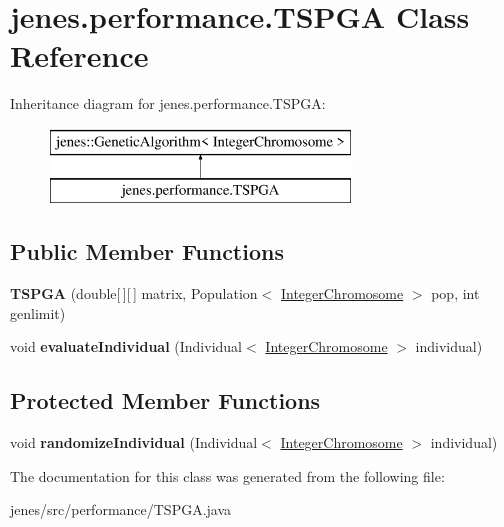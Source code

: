 \hypertarget{classjenes_1_1performance_1_1_t_s_p_g_a}{\section{jenes.\-performance.\-T\-S\-P\-G\-A Class Reference}
\label{classjenes_1_1performance_1_1_t_s_p_g_a}
}
Inheritance diagram for jenes.\-performance.\-T\-S\-P\-G\-A\-:\begin{figure}[H]
\begin{center}
\leavevmode
\includegraphics[height=2.000000cm]{classjenes_1_1performance_1_1_t_s_p_g_a}
\end{center}
\end{figure}
\subsection*{Public Member Functions}
\begin{DoxyCompactItemize}
\item 
\hypertarget{classjenes_1_1performance_1_1_t_s_p_g_a_a698ea31a106a7f42ffc65997bbee05fe}{{\bfseries T\-S\-P\-G\-A} (double\mbox{[}$\,$\mbox{]}\mbox{[}$\,$\mbox{]} matrix, Population$<$ \hyperlink{classjenes_1_1chromosome_1_1_integer_chromosome}{Integer\-Chromosome} $>$ pop, int genlimit)}\label{classjenes_1_1performance_1_1_t_s_p_g_a_a698ea31a106a7f42ffc65997bbee05fe}

\item 
\hypertarget{classjenes_1_1performance_1_1_t_s_p_g_a_a78282f6c98a63d8f438364a79d8239ab}{void {\bfseries evaluate\-Individual} (Individual$<$ \hyperlink{classjenes_1_1chromosome_1_1_integer_chromosome}{Integer\-Chromosome} $>$ individual)}\label{classjenes_1_1performance_1_1_t_s_p_g_a_a78282f6c98a63d8f438364a79d8239ab}

\end{DoxyCompactItemize}
\subsection*{Protected Member Functions}
\begin{DoxyCompactItemize}
\item 
\hypertarget{classjenes_1_1performance_1_1_t_s_p_g_a_a469f2cfa3bf84b07af85546e610fd624}{void {\bfseries randomize\-Individual} (Individual$<$ \hyperlink{classjenes_1_1chromosome_1_1_integer_chromosome}{Integer\-Chromosome} $>$ individual)}\label{classjenes_1_1performance_1_1_t_s_p_g_a_a469f2cfa3bf84b07af85546e610fd624}

\end{DoxyCompactItemize}


The documentation for this class was generated from the following file\-:\begin{DoxyCompactItemize}
\item 
jenes/src/performance/T\-S\-P\-G\-A.\-java\end{DoxyCompactItemize}
